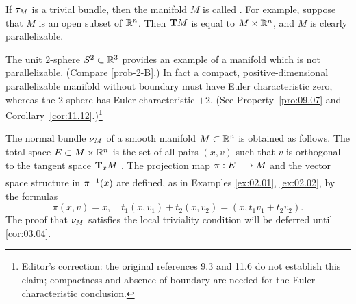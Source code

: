 \documentclass[../main]{subfiles}
\begin{document}
If $\tangentBundle{M}$ is a trivial bundle, then the manifold $M$ is called .
For example, suppose that $M$ is an open subset of $\bR^n$. Then $\tangentTS M$ is
equal to $M \times \bR^n$, and $M$ is clearly parallelizable.

The unit $2$-sphere $\Sphere^{2}\subset \bR^3$ provides an example of a manifold which
is not parallelizable. (Compare \ref{prob-2-B}.) In fact a compact, positive-dimensional parallelizable manifold without boundary must have Euler characteristic zero, whereas
the $2$-sphere has Euler characteristic $+2$. (See Property~\ref{pro:09.07} and Corollary~\ref{cor:11.12}.)\footnote{Editor's correction: the original references 9.3 and 11.6 do not establish this claim; compactness and absence of boundary are needed for the Euler-characteristic conclusion.}


\begin{example}\label{ex:02.03}
The normal bundle $\normalbundle{M}$ of a smooth manifold $M \subset \bR^n$ is
obtained as follows. The total space
$\total \subset M \times \bR^n$
is the set of all pairs $(x, v)$ such that $v$ is orthogonal to the tangent
space $\tangentspace Mx$ . The projection map $\pi: \total \varrightarrow{} M$ and the vector space 
structure in $\pi\inv(x)$ are defined, as in Examples \ref{ex:02.01}, \ref{ex:02.02}, by the formulas
\[\pi(x, v) = x,
\quad t_1(x, v_1) + t_2(x, v_2) = (x, t_1v_1 + t_2v_2).\]
The proof that $\normalbundle{M}$ satisfies
the local triviality condition will be deferred until \ref{cor:03.04}.
\end{example}
\end{document}
